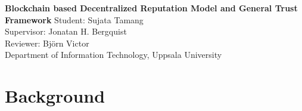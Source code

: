 \documentclass[a4paper,11pt,dvipsnames]{article}
\begin{document}
	\begin{center}
		\textbf{\huge{Blockchain based Decentralized Reputation Model and 
		General Trust Framework}}
		\newline
		\textsf{\large{Student: Sujata Tamang}}\\
		\textsf{\large{Supervisor: Jonatan H. Bergquist }}\\
		\textsf{\large{Reviewer: Björn Victor}}\\
		\textsf{\large{Department of Information Technology, Uppsala University}}
	\end{center}
	
	\section*{Background}
\end{document}
